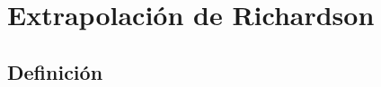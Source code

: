 \documentclass[12pt]{beamer}
\begin{document}

\section{Extrapolación de Richardson}
\subsection{Definición}
\end{document}
